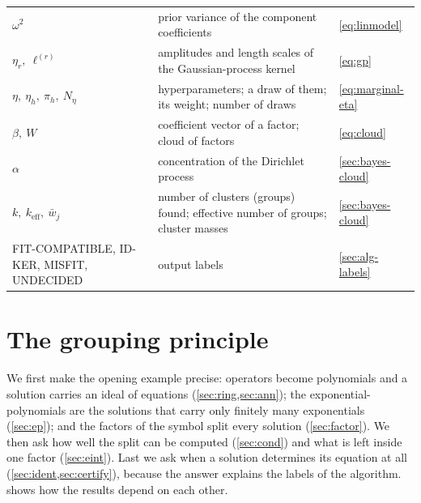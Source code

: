 \documentclass[11pt]{article}
\theoremstyle{plain}
\theoremstyle{definition}
\theoremstyle{remark}
\newcommand{\keff}{k_{\mathrm{eff}}}        %
\newcommand{\cloud}{W}                      %
\newcommand{\lab}[1]{\textsf{#1}}           %
\newcommand{\FC}{\lab{FIT-COMPATIBLE}}
\newcommand{\IDK}{\lab{ID-KER}}
\newcommand{\MIS}{\lab{MISFIT}}
\newcommand{\UND}{\lab{UNDECIDED}}
\begin{document}
\begin{table}[htbp]
\begin{tabularx}{\linewidth}{@{}l X l@{}}
$\omega^2$ & prior variance of the component coefficients & \eqref{eq:linmodel}\\
$\eta_r,\ \ell^{(r)}$ & amplitudes and length scales of the Gaussian-process kernel & \eqref{eq:gp}\\
$\eta,\ \eta_h,\ \pi_h,\ N_\eta$ & hyperparameters; a draw of them; its weight; number of draws & \eqref{eq:marginal-eta}\\
$\beta,\ \cloud$ & coefficient vector of a factor; cloud of factors & \eqref{eq:cloud}\\
$\alpha$ & concentration of the Dirichlet process & \cref{sec:bayes-cloud}\\
$k,\ \keff,\ \bar w_j$ & number of clusters (groups) found; effective number of groups; cluster masses & \cref{sec:bayes-cloud}\\
\FC, \IDK, \MIS, \UND & output labels & \cref{sec:alg-labels}\\
\bottomrule
\end{tabularx}
\end{table}





\section{The grouping principle}\label{sec:theory}
We first make the opening example precise: operators become polynomials and a solution carries an ideal of equations
(\cref{sec:ring,sec:ann}); the exponential-polynomials are the solutions that carry only finitely many exponentials
(\cref{sec:ep}); and the factors of the symbol split every solution (\cref{sec:factor}). We then ask how well the split
can be computed (\cref{sec:cond}) and what is left inside one factor (\cref{sec:eint}). Last we ask when a solution
determines its equation at all (\cref{sec:ident,sec:certify}), because the answer explains the labels of the algorithm.
 shows how the results depend on each other.
\end{document}
